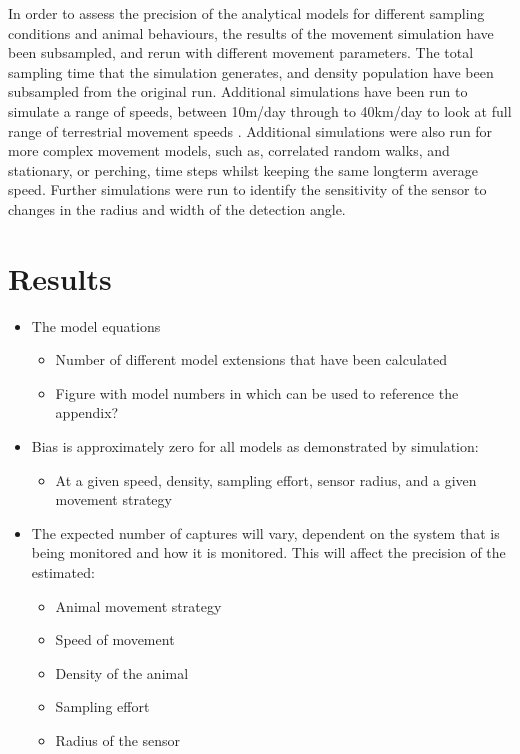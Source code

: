 \documentclass[a4paper,10pt,reqno,oneside]{amsart}
\begin{document}
In order to assess the precision of the analytical models for different sampling conditions and animal behaviours, the results of the movement simulation have been subsampled, and rerun with different movement parameters. The total sampling time that the simulation generates, and density population have been subsampled from the original run. Additional simulations have been run to simulate a range of speeds, between 10m/day through to 40km/day to look at full range of terrestrial movement speeds \cite{carbone2005far}. Additional simulations were also run for more complex movement models, such as, correlated random walks, and stationary, or perching, time steps whilst keeping the same longterm average speed. Further simulations were run to identify the sensitivity of the sensor to changes in the radius and width of the detection angle.





\section{Results}

\begin{itemize}
\item The model equations
	\begin{itemize}
	\item Number of different model extensions that have been calculated
	\item Figure with model numbers in which can be used to reference the appendix?
	\end{itemize}
\item Bias is approximately zero for all models as demonstrated by simulation: 
	\begin{itemize}
	\item At a given speed, density, sampling effort, sensor radius, and a given movement strategy
	\end{itemize}
\item The expected number of captures will vary, dependent on the system that is being monitored and how it is monitored. This will affect the precision of the estimated: 
	\begin{itemize}
	\item Animal movement strategy
	\item Speed of movement
	\item Density of the animal
	\item Sampling effort
	\item Radius of the sensor
	\end{itemize}
\end{itemize}
\end{document}
